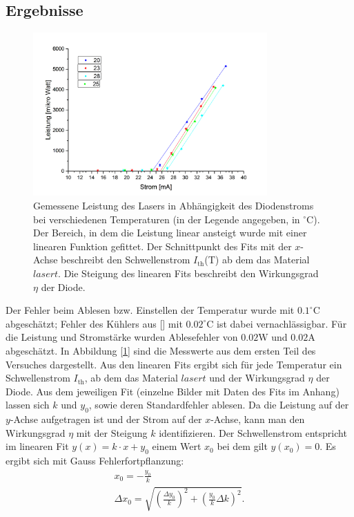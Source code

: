 \documentclass[a4paper,10pt]{scrartcl} %
\begin{document}
\subsection{Ergebnisse}
\label{subsec:Leistung_Ergebnisse}

\begin{figure}
\centering
\includegraphics[width=0.8\textwidth]{Bilder/merged_1.png}
\caption{
Gemessene Leistung des Lasers in Abhängigkeit des Diodenstroms bei verschiedenen Temperaturen (in der Legende angegeben, in $^\circ{\text{C}}$). Der Bereich, in dem die Leistung linear ansteigt wurde mit einer linearen Funktion gefittet. Der Schnittpunkt des Fits mit der $x$-Achse beschreibt den Schwellenstrom $I_{\text{th}}$(T) ab dem das Material $lasert$. Die Steigung des linearen Fits beschreibt den Wirkungsgrad $\eta$ der Diode.
}
\label{fig:1_fits}
\end{figure}
Der Fehler beim Ablesen bzw. Einstellen der Temperatur wurde mit $0.1 ^\circ{\text{C}}$ abgeschätzt; Fehler des Kühlers aus [\cite{Mount}] mit $0.02 ^\circ{\text{C}}$ ist dabei vernachlässigbar. Für die Leistung und Stromstärke wurden Ablesefehler von $0.02 \text{W}$ und $0.02 \text{A}$ abgeschätzt.
In Abbildung [\ref{fig:1_fits}] sind die Messwerte aus dem ersten Teil des Versuches dargestellt. Aus den linearen Fits ergibt sich für jede Temperatur ein Schwellenstrom $I_{\text{th}}$, ab dem das Material $lasert$ und der Wirkungsgrad $\eta$ der Diode. Aus dem jeweiligen Fit (einzelne Bilder mit Daten des Fits im Anhang) lassen sich $k$ und $y_0$, sowie deren Standardfehler ablesen. Da die Leistung auf der $y$-Achse aufgetragen ist und der Strom auf der $x$-Achse, kann man den Wirkungsgrad $\eta$ mit der Steigung $k$ identifizieren. Der Schwellenstrom entspricht im linearen Fit $y(x) = k\cdot x + y_0$ einem Wert $x_0$ bei dem gilt $y(x_0) = 0$. Es ergibt sich mit Gauss Fehlerfortpflanzung:
\begin{align}
x_0 = -\frac{y_0}{k} \\
\Delta x_0 = \sqrt{\left(\frac{\Delta y_0}{k}\right)^2 + \left(\frac{y_0}{k}\Delta k \right)^2}.
\end{align}
\end{document}
